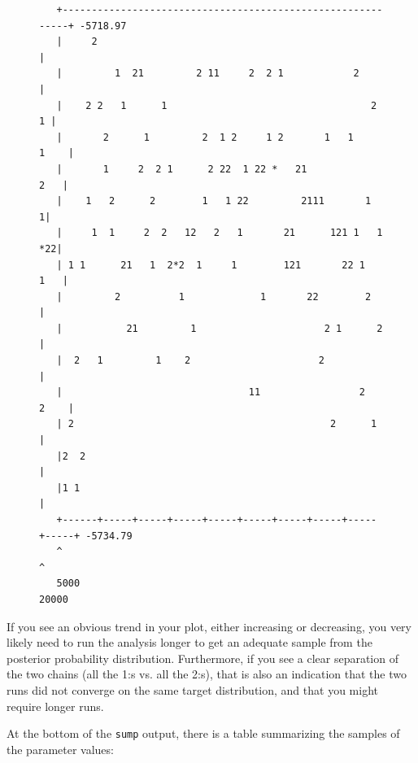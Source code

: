 \documentclass[12pt]{book}
\newcommand{\ttt}[1]{\texttt{#1}}
\begin{document}
\begin{figure}[h]\singlespacing\footnotesize
\begin{verbatim}
   +------------------------------------------------------------+ -5718.97
   |     2                                                      |
   |         1  21         2 11     2  2 1            2         |
   |    2 2   1      1                                   2    1 |
   |       2      1         2  1 2     1 2       1   1     1    |
   |       1     2  2 1      2 22  1 22 *   21              2   |
   |    1   2      2        1   1 22         2111       1      1|
   |     1  1     2  2   12   2   1       21      121 1   1  *22|
   | 1 1      21   1  2*2  1     1        121       22 1    1   |
   |         2          1             1       22        2       |
   |           21         1                      2 1      2     |
   |  2   1         1    2                      2               |
   |                                11                 2   2    |
   | 2                                            2      1      |
   |2  2                                                        |
   |1 1                                                         |
   +------+-----+-----+-----+-----+-----+-----+-----+-----+-----+ -5734.79
   ^                                                            ^
   5000                                                         20000
\end{verbatim}\end{figure}

If you see an obvious trend in your plot, either increasing or decreasing, you very likely need to
run the analysis longer to get an adequate sample from the posterior probability distribution.
Furthermore, if you see a clear separation of the two chains (all the 1:s vs. all the 2:s), that is
also an indication that the two runs did not converge on the same target distribution, and that you
might require longer runs.

At the bottom of the \ttt{sump} output, there is a table summarizing the samples of the parameter
values:
\end{document}
